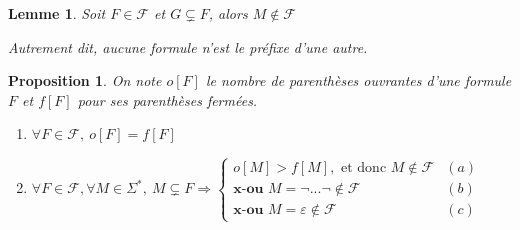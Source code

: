 \documentclass[]{article}
\newtheorem{myproposition}{Proposition}
\newtheorem{mylemma}{Lemme}
\theoremstyle{remark}
\theoremstyle{definition}
\begin{document}
\begin{mylemma}
	Soit $F \in \mathcal{F}$ et $G \subsetneq F$, alors $M \notin \mathcal{F}$
	
	Autrement dit, aucune formule n'est le préfixe d'une autre.
\end{mylemma}

\begin{myproposition}
	On note $o[F]$ le nombre de parenthèses ouvrantes d'une formule $F$ et $f[F]$ pour ses parenthèses fermées.
	\begin{enumerate}
			\item $\forall F \in \mathcal{F}, ~ o[F]=f[F]$
			\item $\forall F \in \mathcal{F}, \forall M \in \Sigma^*, ~ M \subsetneq F \Longrightarrow
			\left\{
			\begin{array}{ll}
				o[M] > f[M], \text{ et donc } M \notin \mathcal{F} & (a) \\
				\textbf{x-ou } M = \neg ... \neg \notin \mathcal{F} & (b)\\
				\textbf{x-ou } M = \varepsilon \notin \mathcal{F} & (c)
			\end{array}
			\right.$
	\end{enumerate}
\end{myproposition}
\end{document}
